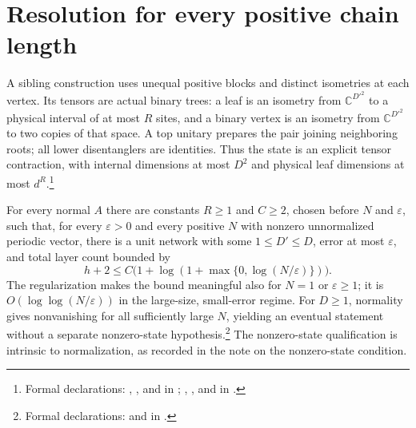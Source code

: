 \documentclass{article}
\begin{document}
\section{Resolution for every positive chain length}
A sibling construction uses unequal positive blocks and distinct isometries
at each vertex. Its tensors are actual binary trees:
a leaf is an isometry from $\mathbb{C}^{D'^2}$ to a physical interval of at most
$R$ sites, and a binary vertex is an isometry from $\mathbb{C}^{D'^2}$ to two
copies of that space. A top unitary prepares the pair joining neighboring roots;
all lower disentanglers are identities. Thus the state is an explicit tensor
contraction, with internal dimensions at most $D^2$ and physical leaf dimensions
at most $d^R$.\footnote{Formal declarations:
    ,
    , and
    in ;
    ,
    , and
    in .}

For every normal $A$ there are constants $R\ge1$ and $C\ge2$, chosen before
$N$ and $\varepsilon$, such that, for every $\varepsilon>0$ and every positive
$N$ with nonzero unnormalized periodic vector, there is a unit network with
some $1\le D'\le D$,
error at most $\varepsilon$, and total layer count bounded by
\[
    h+2\le C\bigl(1+\log(1+\max\{0,\log(N/\varepsilon)\})\bigr).
\]
The regularization makes the bound meaningful also for $N=1$ or
$\varepsilon\ge1$; it is $O(\log\log(N/\varepsilon))$ in the large-size,
small-error regime. For $D\ge1$, normality gives nonvanishing for all sufficiently large
$N$, yielding an eventual statement without a separate nonzero-state
hypothesis.\footnote{Formal declarations:
     and
    in .}
The nonzero-state qualification is intrinsic to normalization, as recorded
in the note on the nonzero-state condition.
\end{document}
